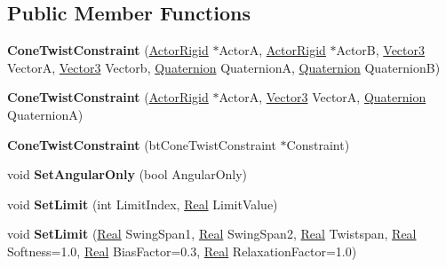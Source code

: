 \subsection*{Public Member Functions}
\begin{DoxyCompactItemize}
\item 
\hypertarget{classphys_1_1ConeTwistConstraint_ab72e1489ea91e47ebbeee41dee116040}{
{\bfseries ConeTwistConstraint} (\hyperlink{classphys_1_1ActorRigid}{ActorRigid} $\ast$ActorA, \hyperlink{classphys_1_1ActorRigid}{ActorRigid} $\ast$ActorB, \hyperlink{classphys_1_1Vector3}{Vector3} VectorA, \hyperlink{classphys_1_1Vector3}{Vector3} Vectorb, \hyperlink{classphys_1_1Quaternion}{Quaternion} QuaternionA, \hyperlink{classphys_1_1Quaternion}{Quaternion} QuaternionB)}
\label{da/dbc/classphys_1_1ConeTwistConstraint_ab72e1489ea91e47ebbeee41dee116040}

\item 
\hypertarget{classphys_1_1ConeTwistConstraint_ab9c2ee7346f1b862d508cbefe22e54e0}{
{\bfseries ConeTwistConstraint} (\hyperlink{classphys_1_1ActorRigid}{ActorRigid} $\ast$ActorA, \hyperlink{classphys_1_1Vector3}{Vector3} VectorA, \hyperlink{classphys_1_1Quaternion}{Quaternion} QuaternionA)}
\label{da/dbc/classphys_1_1ConeTwistConstraint_ab9c2ee7346f1b862d508cbefe22e54e0}

\item 
\hypertarget{classphys_1_1ConeTwistConstraint_a38a9a0e7676d8ad8f77831a319bc007b}{
{\bfseries ConeTwistConstraint} (btConeTwistConstraint $\ast$Constraint)}
\label{da/dbc/classphys_1_1ConeTwistConstraint_a38a9a0e7676d8ad8f77831a319bc007b}

\item 
\hypertarget{classphys_1_1ConeTwistConstraint_a1e2ffb465a8ceab4b77663b9e446a3ae}{
void {\bfseries SetAngularOnly} (bool AngularOnly)}
\label{da/dbc/classphys_1_1ConeTwistConstraint_a1e2ffb465a8ceab4b77663b9e446a3ae}

\item 
\hypertarget{classphys_1_1ConeTwistConstraint_ae8519afb837606a39dfaef447ae96888}{
void {\bfseries SetLimit} (int LimitIndex, \hyperlink{namespacephys_af7eb897198d265b8e868f45240230d5f}{Real} LimitValue)}
\label{da/dbc/classphys_1_1ConeTwistConstraint_ae8519afb837606a39dfaef447ae96888}

\item 
\hypertarget{classphys_1_1ConeTwistConstraint_ac2c48c24f694367a55ed35dd8ed7e10c}{
void {\bfseries SetLimit} (\hyperlink{namespacephys_af7eb897198d265b8e868f45240230d5f}{Real} SwingSpan1, \hyperlink{namespacephys_af7eb897198d265b8e868f45240230d5f}{Real} SwingSpan2, \hyperlink{namespacephys_af7eb897198d265b8e868f45240230d5f}{Real} Twistspan, \hyperlink{namespacephys_af7eb897198d265b8e868f45240230d5f}{Real} Softness=1.0, \hyperlink{namespacephys_af7eb897198d265b8e868f45240230d5f}{Real} BiasFactor=0.3, \hyperlink{namespacephys_af7eb897198d265b8e868f45240230d5f}{Real} RelaxationFactor=1.0)}
\label{da/dbc/classphys_1_1ConeTwistConstraint_ac2c48c24f694367a55ed35dd8ed7e10c}


\end{DoxyCompactItemize}
